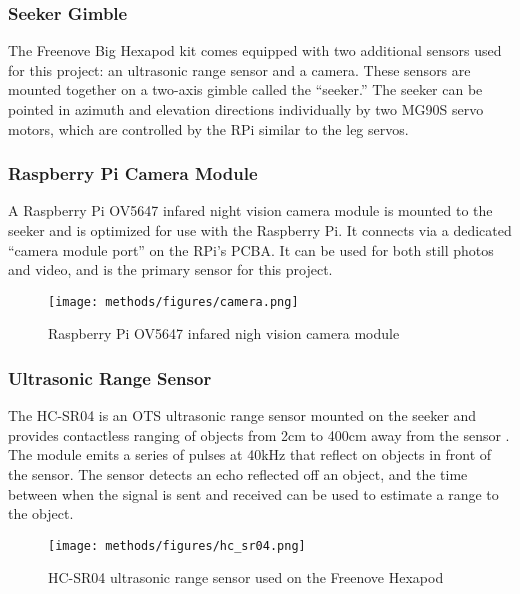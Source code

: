 \subsubsection{ Seeker Gimble }

The Freenove Big Hexapod kit comes equipped with two additional sensors used for this project: an ultrasonic range sensor and a camera. These sensors are mounted together on a two-axis gimble called the ``seeker.'' The seeker can be pointed in azimuth and elevation directions individually by two MG90S servo motors, which are controlled by the RPi similar to the leg servos.

\subsubsection{ Raspberry Pi Camera Module}

A Raspberry Pi OV5647 infared night vision camera module is mounted to the seeker and is optimized for use with the Raspberry Pi.  It connects via a dedicated ``camera module port'' on the RPi's PCBA. It can be used for both still photos and video, and is the primary sensor for this project.

\begin{figure}[h]
    \centering
    \texttt{[image: methods/figures/camera.png]}
    \caption{Raspberry Pi OV5647 infared nigh vision camera module}
    \label{fig:raspberry_pi_cam}
\end{figure}

\subsubsection{ Ultrasonic Range Sensor }
The HC-SR04 is an OTS ultrasonic range sensor mounted on the seeker and provides contactless ranging of objects from 2cm to 400cm away from the sensor \cite{hcsr04}.  The module emits a series of pulses at 40kHz that reflect on objects in front of the sensor. The sensor detects an echo reflected off an object, and the time between when the signal is sent and received can be used to estimate a range to the object. 

\begin{figure}[h]
    \centerline{\texttt{[image: methods/figures/hc\_sr04.png]}}
    \caption{HC-SR04 ultrasonic range sensor used on the Freenove Hexapod}
    \label{fig:HC-SR04}
\end{figure}

